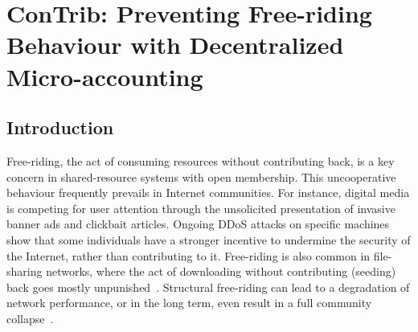 \chapter{ConTrib: Preventing Free-riding Behaviour with Decentralized Micro-accounting}
\label{chapter2}

\section{Introduction}
Free-riding, the act of consuming resources without contributing back, is a key concern in shared-resource systems with open membership.
This uncooperative behaviour frequently prevails in Internet communities.
For instance, digital media is competing for user attention through the unsolicited presentation of invasive banner ads and clickbait articles.
Ongoing DDoS attacks on specific machines show that some individuals have a stronger incentive to undermine the security of the Internet, rather than contributing to it.
Free-riding is also common in file-sharing networks, where the act of downloading without contributing (seeding) back goes mostly unpunished~\cite{locher2006free}.
Structural free-riding can lead to a degradation of network performance, or in the long term, even result in a full community collapse~\cite{adar2000free}.





